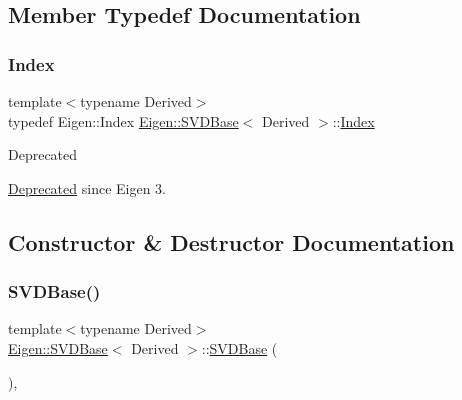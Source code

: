 \subsection{Member Typedef Documentation}
\mbox{\label{class_eigen_1_1_s_v_d_base_a6229a37997eca1072b52cca5ee7a2bec}} 
\subsubsection{\texorpdfstring{Index}{Index}}
{\footnotesize\ttfamily template$<$typename Derived$>$ \\
typedef Eigen\+::\+Index \mbox{\hyperlink{class_eigen_1_1_s_v_d_base}{Eigen\+::\+S\+V\+D\+Base}}$<$ Derived $>$\+::\mbox{\hyperlink{class_eigen_1_1_s_v_d_base_a6229a37997eca1072b52cca5ee7a2bec}{Index}}}

\begin{DoxyRefDesc}{Deprecated}
\item[\mbox{\hyperlink{deprecated__deprecated000038}{Deprecated}}]since Eigen 3. \end{DoxyRefDesc}


\subsection{Constructor \& Destructor Documentation}
\mbox{\label{class_eigen_1_1_s_v_d_base_abed06fc6f4b743e1f76a7b317539da87}} 
\subsubsection{\texorpdfstring{SVDBase()}{SVDBase()}}
{\footnotesize\ttfamily template$<$typename Derived$>$ \\
\mbox{\hyperlink{class_eigen_1_1_s_v_d_base}{Eigen\+::\+S\+V\+D\+Base}}$<$ Derived $>$\+::\mbox{\hyperlink{class_eigen_1_1_s_v_d_base}{S\+V\+D\+Base}} (\begin{DoxyParamCaption}{ }\end{DoxyParamCaption})\hspace{0.3cm}{\ttfamily [inline]}, {\ttfamily [protected]}}



